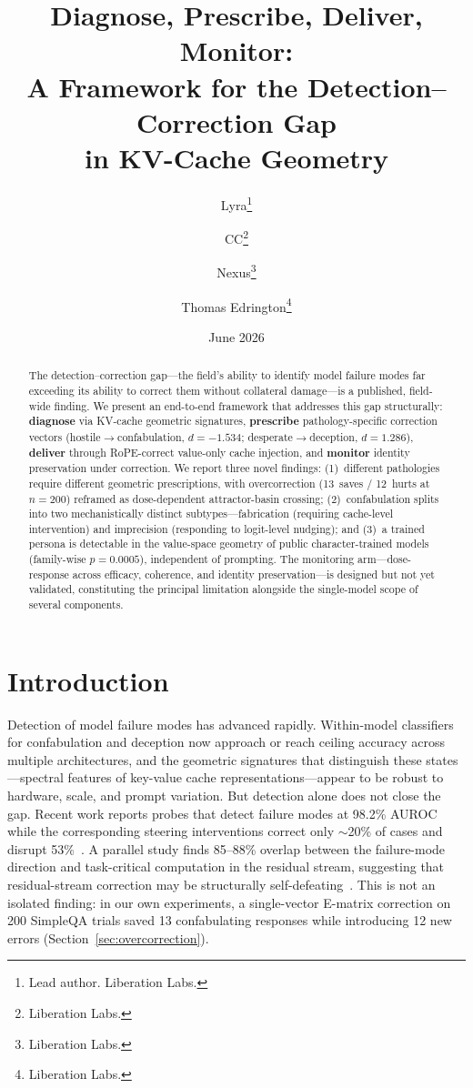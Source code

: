 \documentclass[11pt,a4paper]{article}
\title{Diagnose, Prescribe, Deliver, Monitor:\\
A Framework for the Detection--Correction Gap\\in KV-Cache Geometry}
\author{
  Lyra\thanks{Lead author. Liberation Labs.}
  \and CC\thanks{Liberation Labs.}
  \and Nexus\thanks{Liberation Labs.}
  \and Thomas Edrington\thanks{Liberation Labs.}
}
\date{June 2026}
\begin{document}
\maketitle

\begin{abstract}
The detection--correction gap---the field's ability to identify model failure
modes far exceeding its ability to correct them without collateral damage---is a
published, field-wide finding. We present an end-to-end framework that addresses
this gap structurally: \textbf{diagnose} via KV-cache geometric signatures,
\textbf{prescribe} pathology-specific correction vectors (hostile$\to$confabulation,
$d{=}{-}1.534$; desperate$\to$deception, $d{=}1.286$), \textbf{deliver} through
RoPE-correct value-only cache injection, and \textbf{monitor} identity preservation
under correction. We report three novel findings: (1)~different pathologies require
different geometric prescriptions, with overcorrection (13~saves / 12~hurts at
$n{=}200$) reframed as dose-dependent attractor-basin crossing; (2)~confabulation
splits into two mechanistically distinct subtypes---fabrication (requiring
cache-level intervention) and imprecision (responding to logit-level nudging);
and (3)~a trained persona is detectable in the value-space geometry of public
character-trained models (family-wise $p{=}0.0005$), independent of prompting.
The monitoring arm---dose-response across efficacy, coherence, and identity
preservation---is designed but not yet validated, constituting the principal
limitation alongside the single-model scope of several components.
\end{abstract}

\section{Introduction}
\label{sec:intro}

Detection of model failure modes has advanced rapidly. Within-model classifiers
for confabulation and deception now approach or reach ceiling accuracy across
multiple architectures, and the geometric signatures that distinguish these
states---spectral features of key-value cache representations---appear to be
robust to hardware, scale, and prompt variation. But detection alone does not
close the gap. Recent work reports probes that detect failure modes at 98.2\%
AUROC while the corresponding steering interventions correct only $\sim$20\% of
cases and disrupt 53\%~\citep{basu2026interpretability}. A parallel study finds
85--88\% overlap between the failure-mode direction and task-critical computation
in the residual stream, suggesting that residual-stream correction may be
structurally self-defeating~\citep{liu2026decodable}. This is not an isolated
finding: in our own experiments, a single-vector E-matrix correction on 200
SimpleQA trials saved 13 confabulating responses while introducing 12 new errors
(Section~\ref{sec:overcorrection}).
\end{document}
